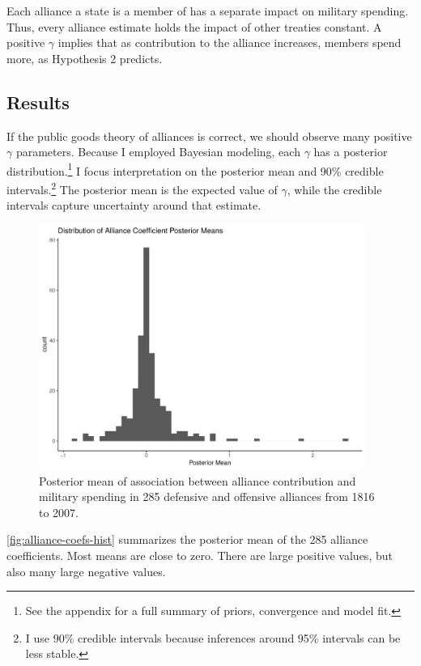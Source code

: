 \documentclass[12pt]{article}
\begin{document}
Each alliance a state is a member of has a separate impact on military spending.
Thus, every alliance estimate holds the impact of other treaties constant. 
A positive $\gamma$ implies that as contribution to the alliance increases, members spend more, as Hypothesis 2 predicts. 
    


\subsection{Results} 


If the public goods theory of alliances is correct, we should observe many positive $\gamma$ parameters. 
Because I employed Bayesian modeling, each $\gamma$ has a posterior distribution.\footnote{See the appendix for a full summary of priors, convergence and model fit.} 
I focus interpretation on the posterior mean and 90\% credible intervals.\footnote{I use 90\% credible intervals because inferences around 95\% intervals can be less stable.}
The posterior mean is the expected value of $\gamma$, while the credible intervals capture uncertainty around that estimate.  


\begin{figure}[htbp]
	\centering
		\includegraphics[width=0.95\textwidth]{alliance-coefs-hist.pdf}
	\caption{Posterior mean of association between alliance contribution and military spending in 285 defensive and offensive alliances from 1816 to 2007.}
	\label{fig:alliance-coefs-hist}
\end{figure}


\autoref{fig:alliance-coefs-hist} summarizes the posterior mean of the 285 alliance coefficients. 
Most means are close to zero. 
There are large positive values, but also many large negative values.
\end{document}
